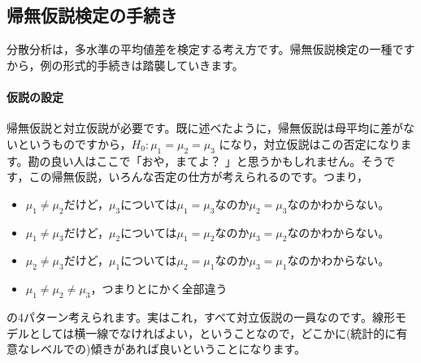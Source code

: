 \documentclass{ltjbook}
\begin{document}



\subsection{帰無仮説検定の手続き}
分散分析は，多水準の平均値差を検定する考え方です。帰無仮説検定の一種ですから，例の形式的手続きは踏襲していきます。
\paragraph{仮説の設定}帰無仮説と対立仮説が必要です。既に述べたように，帰無仮説は母平均に差がないというものですから，$H_0 : \mu_1 = \mu_2 = \mu_3$ になり，対立仮説はこの否定になります。勘の良い人はここで「おや，まてよ？ 」と思うかもしれません。そうです，この帰無仮説，いろんな否定の仕方が考えられるのです。つまり，
\begin{itemize}
	\item $\mu_1 \neq \mu_2$だけど，$\mu_3$については$\mu_1=\mu_3$なのか$\mu_2=\mu_3$なのかわからない。
	\item $\mu_1 \neq \mu_3$だけど，$\mu_2$については$\mu_1=\mu_2$なのか$\mu_3=\mu_2$なのかわからない。
	\item $\mu_2 \neq \mu_3$だけど，$\mu_1$については$\mu_2=\mu_1$なのか$\mu_3=\mu_1$なのかわからない。
	\item $\mu_1 \neq \mu_2 \neq \mu_3$，つまりとにかく全部違う
\end{itemize}
の4パターン考えられます。実はこれ，すべて対立仮説の一員なのです。線形モデルとしては横一線でなければよい，ということなので，どこかに(統計的に有意なレベルでの)傾きがあれば良いということになります。
\end{document}
